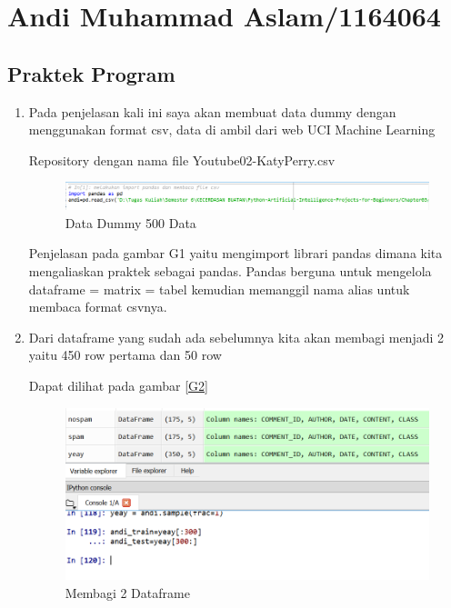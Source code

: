 \section{Andi Muhammad Aslam/1164064}

\subsection{Praktek Program}
\begin{enumerate}
\item Pada penjelasan kali ini saya akan membuat data dummy dengan menggunakan format csv, data di ambil dari web UCI Machine Learning
\par Repository dengan nama file Youtube02-KatyPerry.csv  
\begin{figure}[ht]
	\centerline{\includegraphics[width=1\textwidth]{figures/andi/G1.PNG}}
	\caption{Data Dummy 500 Data}
	\label{Contoh Ilustrasi}
\end{figure}

\subitem Penjelasan pada gambar G1 yaitu mengimport librari pandas dimana kita mengaliaskan praktek sebagai pandas. Pandas berguna untuk mengelola  dataframe = matrix = tabel kemudian memanggil nama alias untuk membaca format csvnya.
\item Dari dataframe yang sudah ada sebelumnya kita akan membagi menjadi 2 yaitu 450 row pertama dan 50 row 
\par Dapat dilihat pada gambar \ref{G2}
\begin{figure}[ht]
	\centerline{\includegraphics[width=1\textwidth]{figures/andi/G2.PNG}}
	\caption{Membagi 2 Dataframe}
	\label{Contoh Ilustrasi}
\end{figure}


\end{enumerate}
